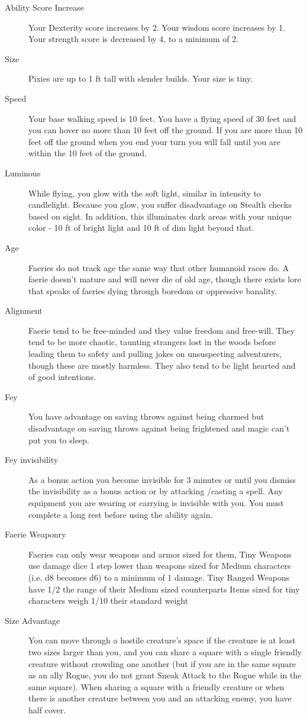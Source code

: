 \documentclass{article}
\begin{document}
\begin{description}
\item [Ability Score Increase] Your Dexterity score increases by 2. Your wisdom score increases by 1. Your strength score is decreased by 4, to a minimum of 2.
\item [Size] Pixies are up to 1 ft tall with slender builds. Your size is tiny.
\item [Speed] Your base walking speed is 10 feet. You have a flying speed of 30 feet and you can hover no more than 10 feet off the ground. If you are more than 10 feet off the ground when you end your turn you will fall until you are within the 10 feet of the ground.
\item [Luminous] While flying, you glow with the soft light, similar in intensity to candlelight. Because you glow, you suffer disadvantage on Stealth checks based on sight. In addition, this illuminates dark areas with your unique color - 10 ft of bright light and 10 ft of dim light beyond that.
\item [Age] Faeries do not track age the same way that other humanoid races do. A faerie doesn't mature and will never die of old age, though there exists lore that speaks of faeries dying through boredom or oppressive banality.
\item [Alignment] Faerie tend to be free-minded and they value freedom and free-will. They tend to be more chaotic, taunting strangers lost in the woods before leading them to safety and pulling jokes on unsuspecting adventurers, though these are mostly harmless. They also tend to be light hearted and of good intentions.
\item [Fey] You have advantage on saving throws against being charmed but disadvantage on saving throws against being frightened and magic can’t put you to sleep.
\item [Fey invisibility] As a bonus action you become invisible for 3 minutes or until you dismiss the invisibility as a bonus action or by attacking /casting a spell. Any equipment you are wearing or carrying is invisible with you. You must complete a long rest before using the ability again.
\item [Faerie Weaponry] Faeries can only wear weapons and armor sized for them, Tiny Weapons use damage dice 1 step lower than weapons sized for Medium characters (i.e. d8 becomes d6) to a minimum of 1 damage. Tiny Ranged Weapons have 1/2 the range of their Medium sized counterparts Items sized for tiny characters weigh 1/10 their standard weight
\item [Size Advantage] You can move through a hostile creature's space if the creature is at least two sizes larger than you, and you can share a square with a single friendly creature without crowding one another (but if you are in the same square as an ally Rogue, you do not grant Sneak Attack to the Rogue while in the same square). When sharing a square with a friendly creature or when there is another creature between you and an attacking enemy, you have half cover.

\end{description}
\end{document}

